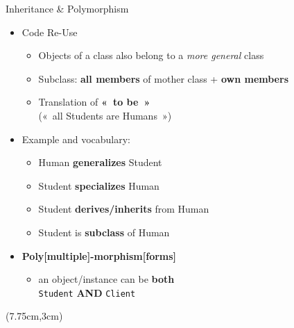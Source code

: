 \documentclass[English,t,%
hyperref={%
    pdftitle={FISA-DE2 OOP in Java},%
    pdfauthor={Guillaume Muller},%
    pdfsubject={OOP in Java},%
    pdfkeywords={OOP,Java}%
    },%
xcolor={pdftex,svgnames} %
]{beamer}
\begin{document}
\begin{frame}{Inheritance \& Polymorphism}

  \begin{itemize}
    \item Code Re-Use
    \begin{itemize}
      \item Objects of a class also belong to a \textit{more general} class
      \item Subclass: \textbf{all members} of mother class + \textbf{own members}
      \item Translation of \textbf{«~to be~»}\\
      («~all Students are Humans~»)
    \end{itemize}
%
    \vspace{1em}
    \item Example and vocabulary:
    \begin{itemize}
      \item Human \textbf{generalizes} Student
      \item Student \textbf{specializes} Human
      \item Student \textbf{derives/inherits} from Human
      \item Student is \textbf{subclass} of Human
    \end{itemize}
%
    \vspace{1em}
    \item<2> \textbf{Poly[multiple]-morphism[forms]}
    \begin{itemize}
      \item an object/instance can be \textbf{both}\\
      \texttt{Student} \textbf{AND} \texttt{Client}
    \end{itemize}
%
  \end{itemize}

  \begin{textblock*}{2cm}(7.75cm,3cm)%
  \end{textblock*}

\end{frame}
\end{document}
